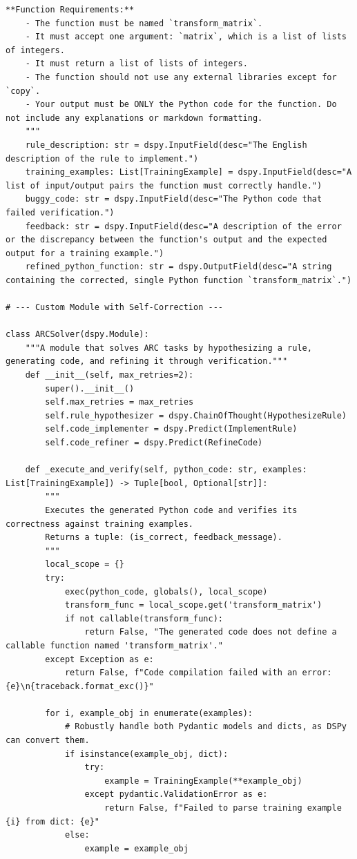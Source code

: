 \begin{instructbox}
\begin{lstlisting}[breakindent=0pt, breaklines=true, breakatwhitespace=true, frame=single, backgroundcolor=\color{blue!10}]
    **Function Requirements:**
    - The function must be named `transform_matrix`.
    - It must accept one argument: `matrix`, which is a list of lists of integers.
    - It must return a list of lists of integers.
    - The function should not use any external libraries except for `copy`.
    - Your output must be ONLY the Python code for the function. Do not include any explanations or markdown formatting.
    """
    rule_description: str = dspy.InputField(desc="The English description of the rule to implement.")
    training_examples: List[TrainingExample] = dspy.InputField(desc="A list of input/output pairs the function must correctly handle.")
    buggy_code: str = dspy.InputField(desc="The Python code that failed verification.")
    feedback: str = dspy.InputField(desc="A description of the error or the discrepancy between the function's output and the expected output for a training example.")
    refined_python_function: str = dspy.OutputField(desc="A string containing the corrected, single Python function `transform_matrix`.")

# --- Custom Module with Self-Correction ---

class ARCSolver(dspy.Module):
    """A module that solves ARC tasks by hypothesizing a rule, generating code, and refining it through verification."""
    def __init__(self, max_retries=2):
        super().__init__()
        self.max_retries = max_retries
        self.rule_hypothesizer = dspy.ChainOfThought(HypothesizeRule)
        self.code_implementer = dspy.Predict(ImplementRule)
        self.code_refiner = dspy.Predict(RefineCode)

    def _execute_and_verify(self, python_code: str, examples: List[TrainingExample]) -> Tuple[bool, Optional[str]]:
        """
        Executes the generated Python code and verifies its correctness against training examples.
        Returns a tuple: (is_correct, feedback_message).
        """
        local_scope = {}
        try:
            exec(python_code, globals(), local_scope)
            transform_func = local_scope.get('transform_matrix')
            if not callable(transform_func):
                return False, "The generated code does not define a callable function named 'transform_matrix'."
        except Exception as e:
            return False, f"Code compilation failed with an error: {e}\n{traceback.format_exc()}"

        for i, example_obj in enumerate(examples):
            # Robustly handle both Pydantic models and dicts, as DSPy can convert them.
            if isinstance(example_obj, dict):
                try:
                    example = TrainingExample(**example_obj)
                except pydantic.ValidationError as e:
                    return False, f"Failed to parse training example {i} from dict: {e}"
            else:
                example = example_obj


\end{lstlisting}
\end{instructbox}
